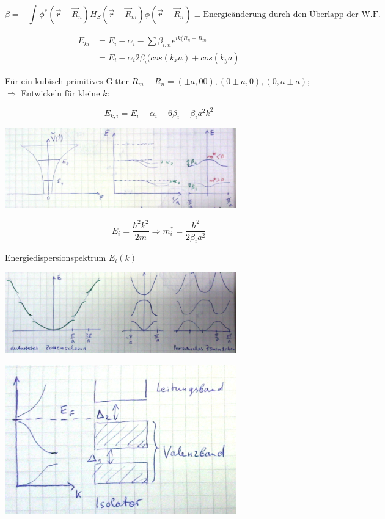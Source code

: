 \[\beta = -\int \phi^*(\vec r- \vec R_n)H_S(\vec r-\vec R_m)\phi(\vec r-\vec R_n)\equiv\text{Energieänderung durch den Überlapp der W.F.}\]

\begin{align}
E_{ki} &= E_i - \alpha_i - \sum\beta_{i,n}e^{ik(R_n-R_m}\\
&= E_i - \alpha_i2\beta_{i}(cos(k_xa)+cos(k_y a)
\end{align}

Für ein kubisch primitives Gitter \(R_m-R_n=(\pm a,00),(0\pm a,0),(0,a\pm a)\); \(\Rightarrow \) Entwickeln für kleine \(k\):

\[E_{k,i}=E_i - \alpha_i-6\beta_i+\beta_i a^2k^2\]



\includegraphics[width=0.75\textwidth]{kap06_41.png}

\[E_i=\frac{\hbar^2k^2}{2m}\Rightarrow m^*_i=\frac{\hbar^2}{2\beta_ia^2}\]

Energiedispersionspektrum \(E_i(k)\)

\includegraphics[width=0.75\textwidth]{kap06_42.png}


\includegraphics[width=0.75\textwidth]{kap06_43.png}

